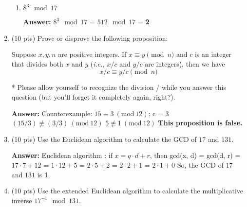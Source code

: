 \documentclass[10pt]{article}
\begin{document}
\begin{enumerate}
\begin{enumerate}
		\item $8^3\mod 17$
		
		\textbf{Answer:} \newline $8^3\mod 17$ = $512\mod 17$ = \textbf{2} \newline
	\end{enumerate}
	
	\item (10 pts) Prove or disprove the following proposition:
	
	Suppose $x,y,n$ are positive integers. If $x\equiv y\pmod n$ and $c$ is an integer that divides both $x$ and $y$ (\textit{i.e.,} $x/c$ and $y/c$ are integers), then we have
	\begin{displaymath}
	x/c\equiv y/c\pmod n
	\end{displaymath}
	
	* Please allow yourself to recognize the division / while you answer this question (but you'll forget it completely again, right?).
	
	\textbf{Answer:} \newline Counterexample: \newline $15\equiv 3\ (\textrm{mod}\ 12)$; c = 3 \newline $(15/3)\not\equiv (3/3)\ (\textrm{mod}\ 12)$ \newline $5\not\equiv 1\ (\textrm{mod}\ 12)$ \newline \textbf{This proposition is false.} 
	
	\item (10 pts) Use the Euclidean algorithm to calculate the GCD of $17$ and $131$.
	
	\textbf{Answer:} \newline Euclidean algorithm : if $x = q\cdot d + r$, then gcd(x, d) = gcd(d, r)  = $17\cdot 7 + 12$  = $1\cdot 12 + 5$  = $2\cdot 5 + 2$  = $2\cdot 2 + 1$  = $2\cdot 1 + 0$ \newline So, the GCD of $17$ and $131$ is \textbf{1}. \newline
	
	\item (10 pts) Use the extended Euclidean algorithm to calculate the multiplicative inverse $17^{-1}\mod 131$.
	

\end{enumerate}
\end{document}
